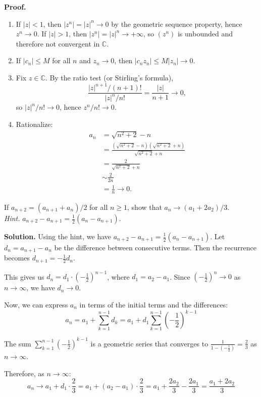 \noindent\textbf{Proof.}
\begin{enumerate}[label=(\alph*)]
\item If $|z|<1$, then $|z^n|=|z|^n\to 0$ by the geometric sequence property, hence $z^n\to 0$. If $|z|>1$, then $|z^n|=|z|^n\to +\infty$, so $(z^n)$ is unbounded and therefore not convergent in $\mathbb{C}$.
\item If $|c_n|\le M$ for all $n$ and $z_n\to 0$, then $|c_n z_n|\le M|z_n|\to 0$.
\item Fix $z\in\mathbb{C}$. By the ratio test (or Stirling's formula),
\[
\frac{|z|^{n+1}/(n+1)!}{|z|^n/n!}=\frac{|z|}{n+1}\to 0,
\]
so $|z|^n/n!\to 0$, hence $z^n/n!\to 0$.
\item Rationalize:
\begin{align*}
a_n&=\sqrt{n^2+2}-n\\
&=\frac{(\sqrt{n^2+2}-n)(\sqrt{n^2+2}+n)}{\sqrt{n^2+2}+n}\\
&=\frac{2}{\sqrt{n^2+2}+n}\\
&\sim \frac{2}{2n}\\
&=\frac{1}{n}\to 0.
\end{align*}
\end{enumerate}
\medskip

\begin{problembox}
If $a_{n+2} = (a_{n+1} + a_n)/2$ for all $n \geq 1$, show that $a_n \to (a_1 + 2a_2)/3$. \\
\textit{Hint.} $a_{n+2} - a_{n+1} = \frac{1}{2}(a_n - a_{n+1})$.
\end{problembox}

\noindent\textbf{Solution.}
Using the hint, we have $a_{n+2} - a_{n+1} = \frac{1}{2}(a_n - a_{n+1})$. Let $d_n = a_{n+1} - a_n$ be the difference between consecutive terms. Then the recurrence becomes $d_{n+1} = -\frac{1}{2}d_n$.

This gives us $d_n = d_1 \cdot \left(-\frac{1}{2}\right)^{n-1}$, where $d_1 = a_2 - a_1$. Since $\left(-\frac{1}{2}\right)^n \to 0$ as $n \to \infty$, we have $d_n \to 0$.

Now, we can express $a_n$ in terms of the initial terms and the differences:
\[
a_n = a_1 + \sum_{k=1}^{n-1} d_k = a_1 + d_1 \sum_{k=1}^{n-1} \left(-\frac{1}{2}\right)^{k-1}
\]

The sum $\sum_{k=1}^{n-1} \left(-\frac{1}{2}\right)^{k-1}$ is a geometric series that converges to $\frac{1}{1 - \left(-\frac{1}{2}\right)} = \frac{2}{3}$ as $n \to \infty$.

Therefore, as $n \to \infty$:
\[
a_n \to a_1 + d_1 \cdot \frac{2}{3} = a_1 + (a_2 - a_1) \cdot \frac{2}{3} = a_1 + \frac{2a_2}{3} - \frac{2a_1}{3} = \frac{a_1 + 2a_2}{3}
\]
\medskip

